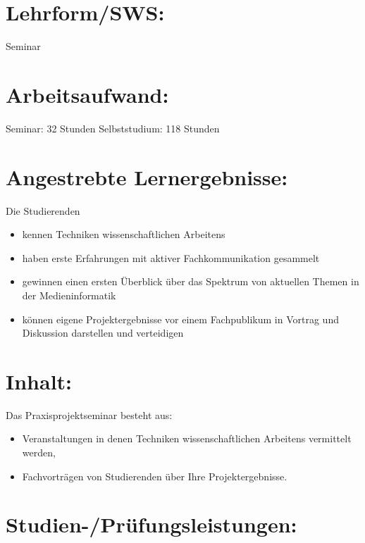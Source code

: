 \section{Lehrform/SWS:}\label{lehrformsws-18}

Seminar

\section{Arbeitsaufwand:}\label{arbeitsaufwand-18}

Seminar: 32 Stunden Selbststudium: 118 Stunden

\section{Angestrebte
Lernergebnisse:}\label{angestrebte-lernergebnisse-19}

Die Studierenden

\begin{itemize}
\item
  kennen Techniken wissenschaftlichen Arbeitens
\item
  haben erste Erfahrungen mit aktiver Fachkommunikation gesammelt
\item
  gewinnen einen ersten Überblick über das Spektrum von aktuellen Themen
  in der Medieninformatik
\item
  können eigene Projektergebnisse vor einem Fachpublikum in Vortrag und
  Diskussion darstellen und verteidigen
\end{itemize}

\section{Inhalt:}\label{inhalt-19}

Das Praxisprojektseminar besteht aus:

\begin{itemize}
\item
  Veranstaltungen in denen Techniken wissenschaftlichen Arbeitens
  vermittelt werden,
\item
  Fachvorträgen von Studierenden über Ihre Projektergebnisse.
\end{itemize}

\section{Studien-/Prüfungsleistungen:}\label{studien-pruxfcfungsleistungen-19}

